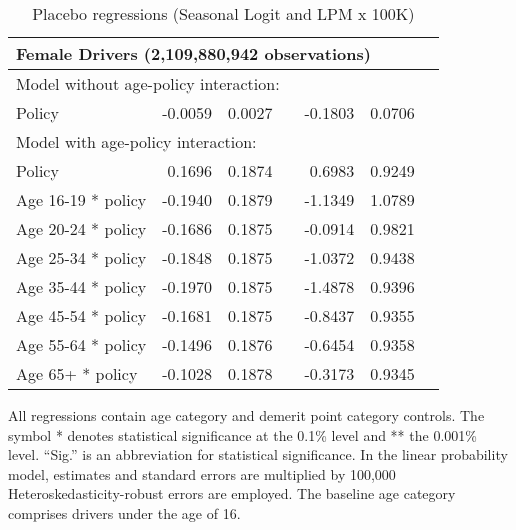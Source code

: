 \begin{table}
\begin{tabular}{l r r l r r l}
\hline 

\multicolumn{7}{l}{\textbf{Female Drivers} (2,109,880,942  observations)} \\ 

\hline
\multicolumn{7}{l}{Model without age-policy interaction: } \\ 
Policy                   &  -0.0059        &  0.0027       &            &  -0.1803        &  0.0706       &            \\ 
\hline
\multicolumn{7}{l}{Model with age-policy interaction: } \\ 
Policy                   &  0.1696        &  0.1874       &            &  0.6983        &  0.9249       &            \\ 
Age 16-19 * policy   &  -0.1940        &  0.1879       &            &  -1.1349        &  1.0789       &            \\ 
Age 20-24 * policy   &  -0.1686        &  0.1875       &            &  -0.0914        &  0.9821       &            \\ 
Age 25-34 * policy   &  -0.1848        &  0.1875       &            &  -1.0372        &  0.9438       &            \\ 
Age 35-44 * policy   &  -0.1970        &  0.1875       &            &  -1.4878        &  0.9396       &            \\ 
Age 45-54 * policy   &  -0.1681        &  0.1875       &            &  -0.8437        &  0.9355       &            \\ 
Age 55-64 * policy   &  -0.1496        &  0.1876       &            &  -0.6454        &  0.9358       &            \\ 
Age 65+ * policy   &  -0.1028        &  0.1878       &            &  -0.3173        &  0.9345       &            \\ 

\hline 

\end{tabular} 
\caption{Placebo regressions (Seasonal Logit and LPM x 100K)} 
All regressions contain age category and demerit point category controls. 
The symbol * denotes statistical significance at the 0.1\% level 
and ** the 0.001\% level. 
``Sig.'' is an abbreviation for statistical significance. 
In the linear probability model, estimates and standard errors are multiplied by 100,000  
Heteroskedasticity-robust errors are employed. 
The baseline age category comprises drivers under the age of 16. 
\label{tab:seas_Logit_vs_LPMx100K_placebo_regs} 
\end{table} 
 
